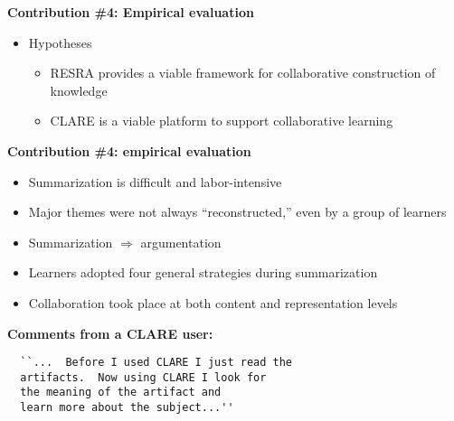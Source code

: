 \begin{slide} \Huge 
{\bf Contribution \#4: Empirical evaluation}
  \horizontalline
    
  \begin{itemize}
  \item Hypotheses

  \begin{itemize}
  \item RESRA provides a viable framework for collaborative construction
    of knowledge
    
  \item CLARE is a viable platform to support collaborative learning
  \end{itemize}    
  \end{itemize}
\end{slide} \Huge


\begin{slide} \Huge
{\bf Contribution \#4: empirical evaluation}
  \horizontalline

  \begin{itemize}
  \item Summarization is difficult and labor-intensive
     
  \item Major themes were not always ``reconstructed,'' even by a group
    of learners
    
  \item Summarization \(\Rightarrow\) argumentation

  \item Learners adopted four general strategies during summarization
    
  \item Collaboration took place at both content and representation
    levels
  \end{itemize}
\end{slide} \Huge


\begin{slide} \Huge
  {\bf Comments from a CLARE user:}

  \horizontalline 
  \begin{verbatim}
  ``...  Before I used CLARE I just read the
  artifacts.  Now using CLARE I look for
  the meaning of the artifact and
  learn more about the subject...'' 
  \end{verbatim}  

\end{slide} \Huge


